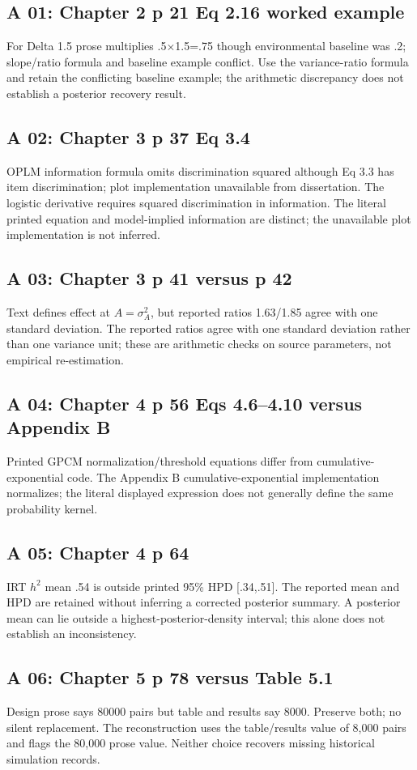 \documentclass[11pt]{article}
\begin{document}
\subsection{A 01: Chapter 2 p 21 Eq 2.16 worked example}
For Delta 1.5 prose multiplies .5$\times$1.5=.75 though environmental baseline was .2; slope/ratio formula and baseline example conflict. Use the variance-ratio formula and retain the conflicting baseline example; the arithmetic discrepancy does not establish a posterior recovery result.
\subsection{A 02: Chapter 3 p 37 Eq 3.4}
OPLM information formula omits discrimination squared although Eq 3.3 has item discrimination; plot implementation unavailable from dissertation. The logistic derivative requires squared discrimination in information. The literal printed equation and model-implied information are distinct; the unavailable plot implementation is not inferred.
\subsection{A 03: Chapter 3 p 41 versus p 42}
Text defines effect at $A=\sigma_A^2$, but reported ratios 1.63/1.85 agree with one standard deviation. The reported ratios agree with one standard deviation rather than one variance unit; these are arithmetic checks on source parameters, not empirical re-estimation.
\subsection{A 04: Chapter 4 p 56 Eqs 4.6--4.10 versus Appendix B}
Printed GPCM normalization/threshold equations differ from cumulative-exponential code. The Appendix B cumulative-exponential implementation normalizes; the literal displayed expression does not generally define the same probability kernel.
\subsection{A 05: Chapter 4 p 64}
IRT $h^2$ mean .54 is outside printed 95\% HPD [.34,.51]. The reported mean and HPD are retained without inferring a corrected posterior summary. A posterior mean can lie outside a highest-posterior-density interval; this alone does not establish an inconsistency.
\subsection{A 06: Chapter 5 p 78 versus Table 5.1}
Design prose says 80000 pairs but table and results say 8000. Preserve both; no silent replacement. The reconstruction uses the table/results value of 8,000 pairs and flags the 80,000 prose value. Neither choice recovers missing historical simulation records.
\end{document}
